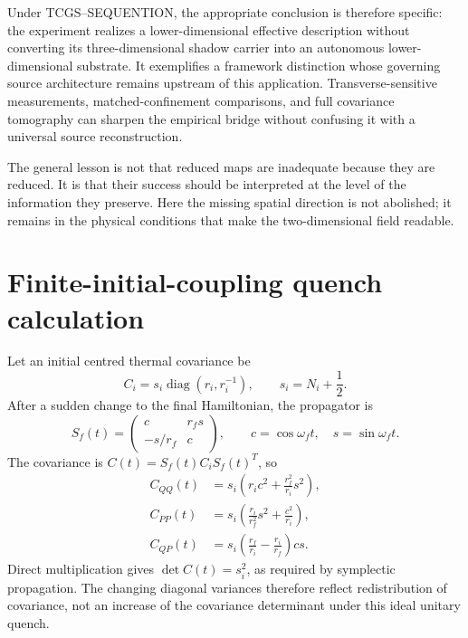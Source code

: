 \documentclass[11pt,a4paper]{article}
\theoremstyle{definition}
\theoremstyle{remark}
\newcommand{\TCGS}{TCGS--SEQUENTION}
\newcommand{\diag}{\operatorname{diag}}
\begin{document}
Under \TCGS, the appropriate conclusion is therefore specific: the experiment realizes a lower-dimensional effective description without converting its three-dimensional shadow carrier into an autonomous lower-dimensional substrate. It exemplifies a framework distinction whose governing source architecture remains upstream of this application. Transverse-sensitive measurements, matched-confinement comparisons, and full covariance tomography can sharpen the empirical bridge without confusing it with a universal source reconstruction.\cite{foundation,logical}

The general lesson is not that reduced maps are inadequate because they are reduced. It is that their success should be interpreted at the level of the information they preserve. Here the missing spatial direction is not abolished; it remains in the physical conditions that make the two-dimensional field readable.

\appendix
\section{Finite-initial-coupling quench calculation}
\label{app:quench}
Let an initial centred thermal covariance be
\begin{equation}
 C_i=s_i\diag(r_i,r_i^{-1}),\qquad s_i=N_i+\frac12.
 \label{eq:Ci}
\end{equation}
After a sudden change to the final Hamiltonian, the propagator is
\begin{equation}
 S_f(t)=\begin{pmatrix}
 c&r_fs\\-s/r_f&c
 \end{pmatrix},\qquad
 c=\cos\omega_ft,\quad s=\sin\omega_ft.
 \label{eq:Sf}
\end{equation}
The covariance is $C(t)=S_f(t)C_iS_f(t)^T$, so
\begin{align}
 C_{QQ}(t)&=s_i\left(r_ic^2+\frac{r_f^2}{r_i}s^2\right),\nonumber\\
 C_{PP}(t)&=s_i\left(\frac{r_i}{r_f^2}s^2+\frac{c^2}{r_i}\right),\nonumber\\
 C_{QP}(t)&=s_i\left(\frac{r_f}{r_i}-\frac{r_i}{r_f}\right)cs.
 \label{eq:quench_covariance}
\end{align}
Direct multiplication gives $\det C(t)=s_i^2$, as required by symplectic propagation. The changing diagonal variances therefore reflect redistribution of covariance, not an increase of the covariance determinant under this ideal unitary quench.
\end{document}
